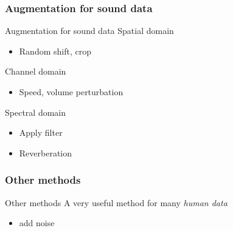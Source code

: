 \subsubsection{Augmentation for sound data}
\begin{frame}{Augmentation for sound data}
    Spatial domain
    \begin{itemize}
        \item Random shift, crop
    \end{itemize}
    Channel domain
    \begin{itemize}
        \item Speed, volume perturbation
    \end{itemize}
    Spectral domain
    \begin{itemize}
        \item Apply filter
        \item Reverberation
    \end{itemize}
\end{frame}

\subsubsection{Other methods}
\begin{frame}{Other methods}
    A very useful method for many \emph{human data}
    \begin{itemize}
        \item add noise
    \end{itemize}
\end{frame}